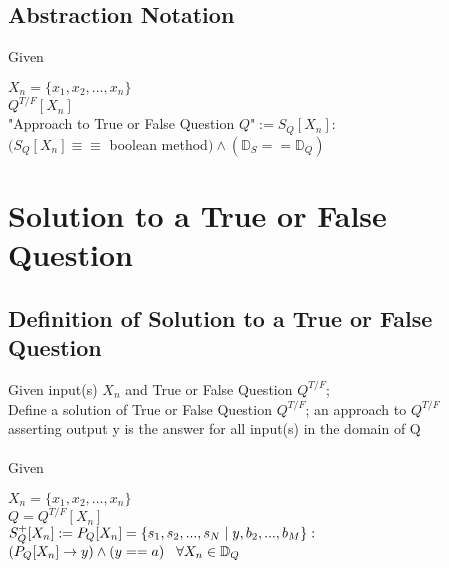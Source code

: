 \documentclass[11pt]{article}
\begin{document}
\subsection{Abstraction Notation}
Given
\begin{center}
$
X_n = \{x_1,x_2,...,x_n\}
$
\\ \vspace{2mm}
$
Q^{T/F}[X_n]
$
\\ \vspace{6mm}
"Approach to True or False Question $Q$"$ := S_{Q}[X_n] :
$
\\ \vspace{2mm}
$
(S_{Q}[X_n] \equiv \equiv$ boolean method$)\land(\mathbb{D}_S == \mathbb{D}_Q)
$
\end{center}









\newpage

\section*{Solution to a True or False Question}
\subsection{Definition of Solution to a True or False Question}
Given input(s) $X_n$ and True or False Question $Q^{T/F}$;\\
Define a solution of True or False Question $Q^{T/F}$; an approach to $Q^{T/F}$\\
asserting output y is the answer for all input(s) in the domain of Q\\
\\
Given
\begin{center}
$
X_n = \{x_1,x_2,...,x_n\}
$
\\ \vspace{2mm}
$
Q = Q^{T/F}[X_n]
$
\\ \vspace{6mm}
$
S^+_{Q}[X_n] := P_{Q}[X_n] =\{ s_1,s_2,...,s_{N}\hspace{1mm}|\hspace{1mm} y, b_2,...,b_M\} :
$
\\ \vspace{2mm}
$
(P_{Q}[X_n] \rightarrow y) \land (y == a) \hspace{3mm} \forall  X_n \in \mathbb{D}_Q
$
\end{center}
\end{document}
